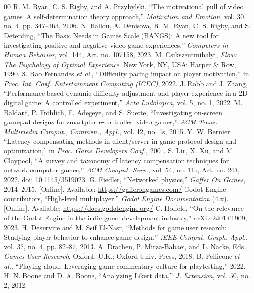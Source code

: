 \documentclass[conference]{IEEEtran}
\begin{document}
\begin{thebibliography}{00}
 R. M. Ryan, C. S. Rigby, and A. Przybylski, ``The motivational pull of video games: A self-determination theory approach,'' \textit{Motivation and Emotion}, vol. 30, no. 4, pp. 347--363, 2006.
 N. Ballou, A. Denisova, R. M. Ryan, C. S. Rigby, and S. Deterding, ``The Basic Needs in Games Scale (BANGS): A new tool for investigating positive and negative video game experiences,'' \textit{Computers in Human Behavior}, vol. 144, Art. no. 107158, 2023. %
 M. Csikszentmihalyi, \textit{Flow: The Psychology of Optimal Experience}. New York, NY, USA: Harper \& Row, 1990.
 S. Rao Fernandes \textit{et al.}, ``Difficulty pacing impact on player motivation,'' in \textit{Proc. Int. Conf. Entertainment Computing (ICEC)}, 2022. %
 J. Robb and J. Zhang, ``Performance-based dynamic difficulty adjustment and player experience in a 2D digital game: A controlled experiment,'' \textit{Acta Ludologica}, vol. 5, no. 1, 2022. %
 M. Baldauf, P. Fr\"ohlich, F. Adegeye, and S. Suette, ``Investigating on-screen gamepad designs for smartphone-controlled video games,'' \textit{ACM Trans. Multimedia Comput., Commun., Appl.}, vol. 12, no. 1s, 2015. %
 Y. W. Bernier, ``Latency compensating methods in client/server in-game protocol design and optimization,'' in \textit{Proc. Game Developers Conf.}, 2001.
 S. Liu, X. Xu, and M. Claypool, ``A survey and taxonomy of latency compensation techniques for network computer games,'' \textit{ACM Comput. Surv.}, vol. 54, no. 11s, Art. no. 243, 2022, doi: 10.1145/3519023.
 G. Fiedler, ``Networked physics,'' \textit{Gaffer On Games}, 2014--2015. [Online]. Available: \url{https://gafferongames.com/} %
 Godot Engine contributors, ``High-level multiplayer,'' \textit{Godot Engine Documentation} (4.x). [Online]. Available: \url{https://docs.godotengine.org/} %
 C. Holfeld, ``On the relevance of the Godot Engine in the indie game development industry,'' arXiv:2401.01909, 2023. %
 H. Desurvire and M. Seif El-Nasr, ``Methods for game user research: Studying player behavior to enhance game design,'' \textit{IEEE Comput. Graph. Appl.}, vol. 33, no. 4, pp. 82--87, 2013.
 A. Drachen, P. Mirza-Babaei, and L. Nacke, Eds., \textit{Games User Research}. Oxford, U.K.: Oxford Univ. Press, 2018.
 B. Pellicone \textit{et al.}, ``Playing aloud: Leveraging game commentary culture for playtesting,'' 2022. %
 H. N. Boone and D. A. Boone, ``Analyzing Likert data,'' \textit{J. Extension}, vol. 50, no. 2, 2012.
\end{thebibliography}
\end{document}
